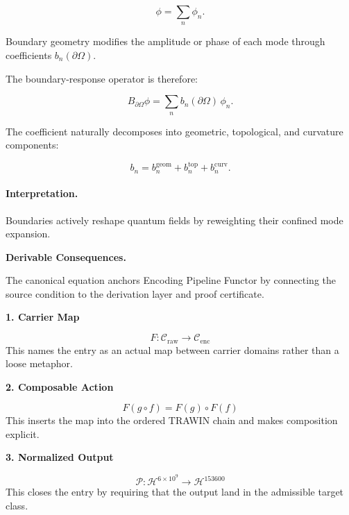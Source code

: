 \begin{equation}
\phi=\sum_n \phi_n .
\end{equation}

Boundary geometry modifies the amplitude or phase of each mode through coefficients $b_n(\partial\Omega)$.

The boundary-response operator is therefore:

\begin{equation}
\boxed{
B_{\partial\Omega}\phi
=
\sum_n b_n(\partial\Omega)\,\phi_n .
}
\end{equation}

The coefficient naturally decomposes into geometric, topological, and curvature components:

\begin{equation}
b_n
=
b_n^{\mathrm{geom}}
+
b_n^{\mathrm{top}}
+
b_n^{\mathrm{curv}} .
\end{equation}

\paragraph{Interpretation.}
Boundaries actively reshape quantum fields by reweighting their confined mode expansion.

\par\vspace{0.35em}
\noindent\textbf{Derivable Consequences.}\quad
\begingroup
\footnotesize
\raggedright
The canonical equation anchors Encoding Pipeline Functor by connecting the source condition to the derivation layer and proof certificate.
\par\endgroup

\noindent\textbf{1. Carrier Map}\par
\[
F:\mathcal{C}_{\mathrm{raw}}\to\mathcal{C}_{\mathrm{enc}}
\]
\noindent This names the entry as an actual map between carrier domains rather than a loose metaphor.\par
\noindent\textbf{2. Composable Action}\par
\[
F(g\circ f)=F(g)\circ F(f)
\]
\noindent This inserts the map into the ordered TRAWIN chain and makes composition explicit.\par
\noindent\textbf{3. Normalized Output}\par
\[
\mathcal{P}:\mathcal{H}^{6\times10^{9}}\to\mathcal{H}^{153600}
\]
\noindent This closes the entry by requiring that the output land in the admissible target class.\par

